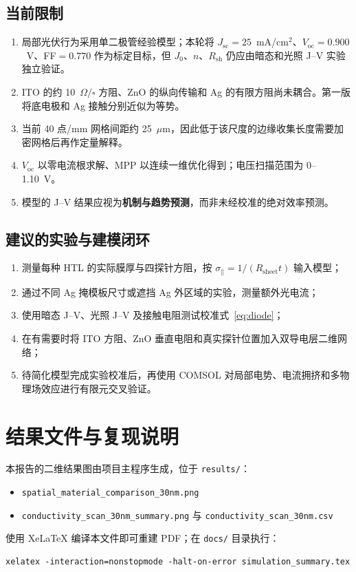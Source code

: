 \documentclass[UTF8,a4paper,11pt]{ctexart}
\newcommand{\sigpar}{\sigma_{\parallel}}
\newcommand{\Rs}{R_{\mathrm{sheet}}}
\begin{document}
\subsection{当前限制}
\begin{enumerate}[label=\arabic*.]
  \item 局部光伏行为采用单二极管经验模型；本轮将 $J_{\mathrm{sc}}=25$~mA/cm$^2$、$V_{\mathrm{oc}}=0.900$~V、FF$=0.770$ 作为标定目标，但 $J_0$、$n$、$R_{\mathrm{sh}}$ 仍应由暗态和光照 J--V 实验独立验证。
  \item ITO 的约 10~$\Omega/\square$ 方阻、ZnO 的纵向传输和 Ag 的有限方阻尚未耦合。第一版将底电极和 Ag 接触分别近似为等势。
  \item 当前 40 点/mm 网格间距约 25~$\mu$m，因此低于该尺度的边缘收集长度需要加密网格后再作定量解释。
  \item $V_{\mathrm{oc}}$ 以零电流根求解、MPP 以连续一维优化得到；电压扫描范围为 0--1.10~V。
  \item 模型的 J--V 结果应视为\textbf{机制与趋势预测}，而非未经校准的绝对效率预测。
\end{enumerate}

\subsection{建议的实验与建模闭环}
\begin{enumerate}[label=\arabic*.]
  \item 测量每种 HTL 的实际膜厚与四探针方阻，按 $\sigpar=1/(\Rs t)$ 输入模型；
  \item 通过不同 Ag 掩模板尺寸或遮挡 Ag 外区域的实验，测量额外光电流；
  \item 使用暗态 J--V、光照 J--V 及接触电阻测试校准式~\eqref{eq:diode}；
  \item 在有需要时将 ITO 方阻、ZnO 垂直电阻和真实探针位置加入双导电层二维网络；
  \item 待简化模型完成实验校准后，再使用 COMSOL 对局部电势、电流拥挤和多物理场效应进行有限元交叉验证。
\end{enumerate}

\section*{结果文件与复现说明}

本报告的二维结果图由项目主程序生成，位于 \texttt{results/}：
\begin{itemize}[nosep]
  \item \texttt{spatial\_material\_comparison\_30nm.png}
  \item \texttt{conductivity\_scan\_30nm\_summary.png} 与 \texttt{conductivity\_scan\_30nm.csv}
\end{itemize}
使用 XeLaTeX 编译本文件即可重建 PDF；在 \texttt{docs/} 目录执行：

\begin{verbatim}
xelatex -interaction=nonstopmode -halt-on-error simulation_summary.tex
\end{verbatim}
\end{document}

